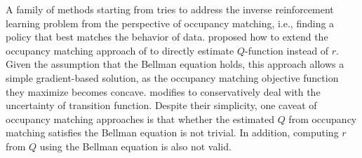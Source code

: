 A family of methods starting from \cite{ho2016generative} tries to address the inverse reinforcement learning problem from the perspective of occupancy matching, i.e., finding a policy that best matches the behavior of data. \cite{garg2021iq} proposed how to extend the occupancy matching approach of \cite{ho2016generative} to directly estimate $Q$-function instead of $r$. Given the assumption that the Bellman equation holds, this approach allows a simple gradient-based solution, as the occupancy matching objective function they maximize becomes concave. \cite{yue2023clare} modifies \cite{ho2016generative} to conservatively deal with the uncertainty of transition function. Despite their simplicity, one caveat of occupancy matching approaches is that whether the estimated $Q$ from occupancy matching satisfies the Bellman equation is not trivial. %
In addition, computing $r$ from $Q$ using the Bellman equation is also not valid.

